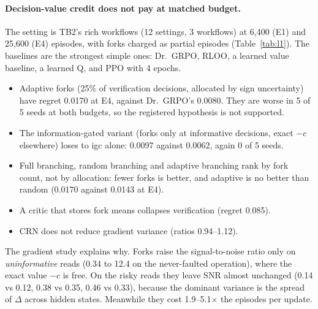 \documentclass[11pt]{article}
\begin{document}
\paragraph{Decision-value credit does not pay at matched budget.} The setting is TB2's rich workflows (12 settings,
3 workflows) at 6{,}400 (E1) and 25{,}600 (E4) episodes, with forks charged as partial episodes
(Table~\ref{tab:l1}). The baselines are the strongest simple ones: Dr.~GRPO, RLOO, a learned value baseline, a
learned Q, and PPO with 4 epochs.
\begin{itemize}
\item Adaptive forks (25\% of verification decisions, allocated by sign uncertainty) have regret 0.0170 at E4,
against Dr.~GRPO's 0.0080. They are worse in 5 of 5 seeds at both budgets, so the registered hypothesis is not
supported.
\item The information-gated variant (forks only at informative decisions, exact $-c$ elsewhere) loses to igc alone:
0.0097 against 0.0062, again 0 of 5 seeds.
\item Full branching, random branching and adaptive branching rank by fork count, not by allocation: fewer forks is
better, and adaptive is no better than random (0.0170 against 0.0143 at E4).
\item A critic that stores fork means collapses verification (regret 0.085).
\item CRN does not reduce gradient variance (ratios 0.94--1.12).
\end{itemize}
The gradient study explains why. Forks raise the signal-to-noise ratio only on \emph{uninformative} reads (0.34 to
12.4 on the never-faulted operation), where the exact value $-c$ is free. On the risky reads they leave SNR almost
unchanged (0.14 vs 0.12, 0.38 vs 0.35, 0.46 vs 0.33), because the dominant variance is the spread of $\Delta$ across
hidden states. Meanwhile they cost 1.9--5.1$\times$ the episodes per update.
\end{document}
